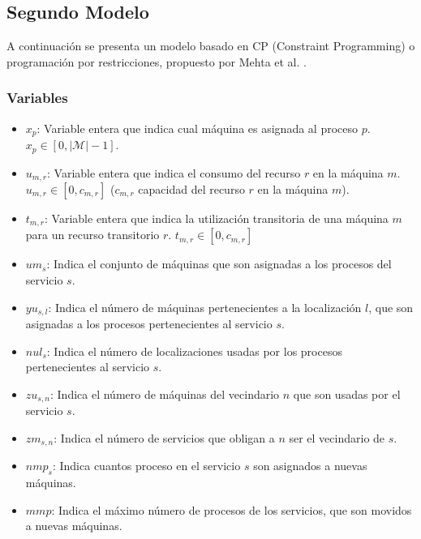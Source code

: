 \subsection{Segundo Modelo}
A continuación se presenta un modelo basado en CP (Constraint Programming) o programación por restricciones, propuesto por Mehta et al. \cite{mehta2012comparing}. 

\subsubsection{Variables}
\begin{itemize}
	\item $x_p$: Variable entera que indica cual máquina es asignada al proceso $p$. $x_p \in [0,|\mathcal{M}|-1]$.
	\item $u_{m,r}$: Variable entera que indica el consumo del recurso $r$ en la máquina $m$. $u_{m,r} \in [0,c_{m,r}]$ ($c_{m,r}$ capacidad del recurso $r$ en la máquina $m$).
	\item $t_{m,r}$: Variable entera que indica la utilización transitoria de una máquina $m$ para un recurso transitorio $r$. $t_{m,r} \in [0,c_{m,r}]$
	\item $um_s$: Indica el conjunto de máquinas que son asignadas a los procesos del servicio $s$.
	\item $yu_{s,l}$: Indica el número de máquinas pertenecientes a la localización $l$, que son asignadas a los procesos pertenecientes al servicio $s$.
	\item $nul_s$: Indica el número de localizaciones usadas por los procesos pertenecientes al servicio $s$.
	\item $zu_{s,n}$: Indica el número de máquinas del vecindario $n$ que son usadas por el servicio $s$.
	\item $zm_{s,n}$: Indica el número de servicios que obligan a $n$ ser el vecindario de $s$.
	\item $nmp_s$: Indica cuantos proceso en el servicio $s$ son asignados a nuevas máquinas.
	\item $mmp$: Indica el máximo número de procesos de los servicios, que son movidos a nuevas máquinas.
\end{itemize}

